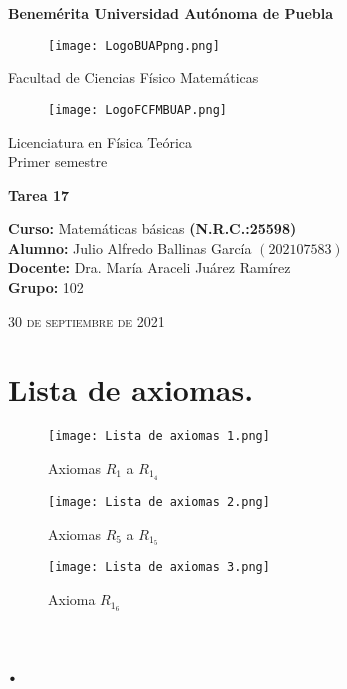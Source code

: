 \documentclass[12pt]{article}
\begin{document}
\sffamily
\thispagestyle{empty} 
\begin{center} \LARGE{\bf Benemérita Universidad Autónoma de Puebla} \\[0.5cm]
\begin{figure}[htb] \centering \texttt{[image: LogoBUAPpng.png]} \end{figure}
\LARGE{Facultad de Ciencias Físico Matemáticas}\\[0.5cm]
\begin{figure}[htb] \centering \texttt{[image: LogoFCFMBUAP.png]} \end{figure} 
\Large{Licenciatura en Física Teórica}\\[0.5cm]
\large{Primer semestre} \end{center}
\begin{center} { \Large \bfseries{Tarea 17}} \\ \end{center}
\large{\bf Curso:} Matemáticas básicas \textbf{(N.R.C.:25598)}\\
\large{\bf Alumno:} Julio Alfredo Ballinas García $\left(202107583\right)$ \\
\large{\bf Docente:} Dra. María Araceli Juárez Ramírez\\
\large{\bf Grupo:} 102\\ \begin{center} 
\vfill
\textsc{30 de septiembre de 2021} \end{center}  
\newpage
\section*{Lista de axiomas.}

\begin{figure}[htb] \centering \texttt{[image: Lista de axiomas 1.png]} 
\caption{Axiomas $R_1$ a $R_1_4$}
\end{figure} 
\newpage
\begin{figure}[htb] \centering \texttt{[image: Lista de axiomas 2.png]} 
\caption{Axiomas $R_5$ a $R_1_5$}
\end{figure} 
\newpage
\begin{figure}[htb] \centering \texttt{[image: Lista de axiomas 3.png]} 
\caption{Axioma $R_1_6$}
\end{figure} 

\vspace{1cm}

\section*{ .} 
\end{document}
